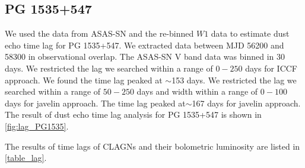 \subsection{PG 1535+547}
We used the data from ASAS-SN and the re-binned $W1$ data to estimate dust echo time lag for PG 1535+547. We extracted data between MJD 56200 and 58300 in observational overlap. The ASAS-SN V band data was binned in 30 days. We restricted the lag we searched within a range of $0-250$ days for ICCF approach. We found the time lag peaked at $\sim$153 days. We restricted the lag we searched within a range of $50-250$ days and width within a range of $0-100$ days for {\sc javelin} approach. The time lag peaked at$\sim$167 days for {\sc javelin} approach. The result of dust echo time lag analysis for PG 1535+547 is shown in \autoref{fig:lag_PG1535}. 

The results of time lags of CLAGNs and their bolometric luminosity are listed in \autoref{table_lag}.

\citep[e.g.][]{2021MNRAS.507..687J}



